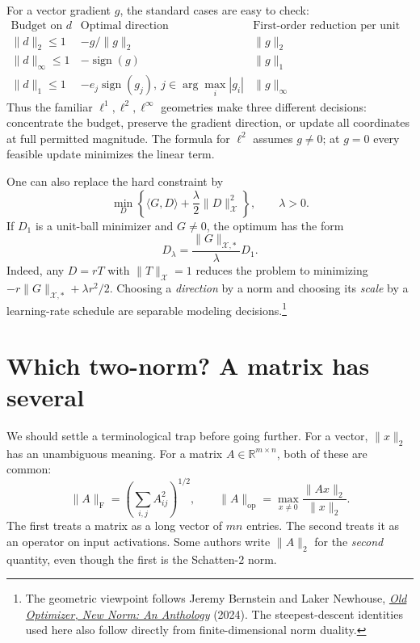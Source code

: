For a vector gradient \(g\), the standard cases are easy to check:
\[
 \begin{array}{c|c|c}
 \text{Budget on }d&\text{Optimal direction}&
 \text{First-order reduction per unit radius}\\ \hline
 \|d\|_2\leq1&-g/\|g\|_2&\|g\|_2\\
 \|d\|_\infty\leq1&-\operatorname{sign}(g)&\|g\|_1\\
 \|d\|_1\leq1&-e_j\operatorname{sign}(g_j),\
     j\in\arg\max_i|g_i|&\|g\|_\infty
 \end{array}
\]
Thus the familiar \(\ell^1,\ell^2,\ell^\infty\) geometries make three different decisions: concentrate the budget, preserve the gradient direction, or update all coordinates at full permitted magnitude.  The formula for \(\ell^2\) assumes \(g\ne0\); at \(g=0\) every feasible update minimizes the linear term.

One can also replace the hard constraint by
\[
 \min_D\left\{\langle G,D\rangle+
 \frac{\lambda}{2}\|D\|_{\mathcal X}^2\right\},
 \qquad\lambda>0.
\]
If \(D_1\) is a unit-ball minimizer and \(G\ne0\), the optimum has the form
\begin{equation}
 D_\lambda=\frac{\|G\|_{\mathcal X,*}}{\lambda}D_1.
 \label{eq:N20261017-regularized-descent}
\end{equation}
Indeed, any \(D=rT\) with \(\|T\|_{\mathcal X}=1\) reduces the problem to minimizing
\(-r\|G\|_{\mathcal X,*}+\lambda r^2/2\).
Choosing a \emph{direction} by a norm and choosing its \emph{scale} by a learning-rate schedule are separable modeling decisions.\footnote{The geometric viewpoint follows Jeremy Bernstein and Laker Newhouse, \href{https://arxiv.org/abs/2409.20325}{\emph{Old Optimizer, New Norm: An Anthology}} (2024).  The steepest-descent identities used here also follow directly from finite-dimensional norm duality.}

\section{Which two-norm? A matrix has several}

We should settle a terminological trap before going further.  For a vector, \(\|x\|_2\) has an unambiguous meaning.  For a matrix \(A\in\mathbb R^{m\times n}\), both of these are common:
\[
 \|A\|_{\mathrm F}
 =\left(\sum_{i,j}A_{ij}^2\right)^{1/2},
 \qquad
 \|A\|_{\mathrm{op}}
 =\max_{x\ne0}\frac{\|Ax\|_2}{\|x\|_2}.
\]
The first treats a matrix as a long vector of \(mn\) entries.  The second treats it as an operator on input activations.  Some authors write \(\|A\|_2\) for the \emph{second} quantity, even though the first is the Schatten-\(2\) norm.

